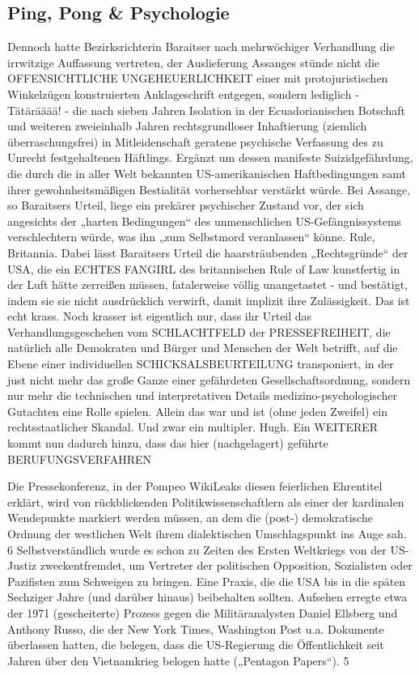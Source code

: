 \begin{multicols}{2}

\chapter{Ping, Pong \& Psychologie} %
Dennoch hatte Bezirksrichterin Baraitser nach mehrwöchiger Verhandlung die irrwitzige Auffassung vertreten, der Auslieferung Assanges stünde nicht die OFFENSICHTLICHE UNGEHEUERLICHKEIT einer mit
protojuristischen Winkelzügen konstruierten Anklageschrift entgegen, sondern lediglich - Tätärääää! - die
nach sieben Jahren Isolation in der Ecuadorianischen
Botschaft und weiteren zweieinhalb Jahren rechtsgrundloser Inhaftierung (ziemlich überraschungsfrei)
in Mitleidenschaft geratene psychische Verfassung des
zu Unrecht festgehaltenen Häftlings. Ergänzt um dessen
manifeste Suizidgefährdung, die durch die in aller Welt
bekannten US-amerikanischen Haftbedingungen samt
ihrer gewohnheitsmäßigen Bestialität vorhersehbar verstärkt würde.
Bei Assange, so Baraitsers Urteil, liege ein prekärer psychischer Zustand vor, der sich angesichts der „harten
Bedingungen“ des unmenschlichen US-Gefängnissystems verschlechtern würde, was ihn „zum Selbstmord
veranlassen“ könne. Rule, Britannia.
Dabei lässt Baraitsers Urteil die haarsträubenden
„Rechtsgründe“ der USA, die ein ECHTES FANGIRL des
britannischen Rule of Law kunstfertig in der Luft hätte
zerreißen müssen, fatalerweise völlig unangetastet - und
bestätigt, indem sie sie nicht ausdrücklich verwirft, damit implizit ihre Zulässigkeit. Das ist echt krass. Noch
krasser ist eigentlich nur, dass ihr Urteil das Verhandlungsgeschehen vom SCHLACHTFELD der PRESSEFREIHEIT, die natürlich alle Demokraten und Bürger
und Menschen der Welt betrifft, auf die Ebene einer individuellen SCHICKSALSBEURTEILUNG transponiert,
in der just nicht mehr das große Ganze einer gefährdeten Gesellschaftsordnung, sondern nur mehr die technischen und interpretativen Details medizino-psychologischer Gutachten eine Rolle spielen.
Allein das war und ist (ohne jeden Zweifel) ein rechtsstaatlicher Skandal. Und zwar ein multipler. Hugh.
Ein WEITERER kommt nun dadurch hinzu, dass das
hier (nachgelagert) geführte BERUFUNGSVERFAHREN

Die Pressekonferenz, in der Pompeo WikiLeaks diesen feierlichen Ehrentitel erklärt, wird von rückblickenden
Politikwissenschaftlern als einer der kardinalen Wendepunkte markiert werden müssen, an dem die (post-)
demokratische Ordnung der westlichen Welt ihrem dialektischen Umschlagspunkt ins Auge sah.
6
Selbstverständlich wurde es schon zu Zeiten des Ersten Weltkriegs von der US-Justiz zweckentfremdet, um Vertreter der politischen Opposition, Sozialisten oder Pazifisten zum Schweigen zu bringen. Eine Praxis, die die
USA bis in die späten Sechziger Jahre (und darüber hinaus) beibehalten sollten. Aufsehen erregte etwa der 1971
(gescheiterte) Prozess gegen die Militäranalysten Daniel Ellsberg und Anthony Russo, die der New York Times,
Washington Post u.a. Dokumente überlassen hatten, die belegen, dass die US-Regierung die Öffentlichkeit seit
Jahren über den Vietnamkrieg belogen hatte („Pentagon Papers“).
5


\end{multicols}
